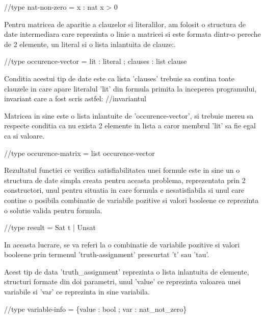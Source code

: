 //type nat-non-zero = x : nat {x > 0}


Pentru matricea de aparitie a clauzelor si literalilor, am folosit o structura de date intermediara care reprezinta o linie a matricei si este formata dintr-o pereche de 2 elemente, un literal si o lista inlantuita de clauze:.

//type occurence-vector = {lit : literal ; clauses : list clause}

Conditia acestui tip de date este ca lista 'clauses' trebuie sa contina toate clauzele in care apare literalul 'lit' din formula primita la inceperea programului, invariant care a fost scris astfel:
//invariantul

Matricea in sine este o lista inlantuite de 'occurence-vector', si trebuie mereu sa respecte conditia ca nu exista 2 elemente in lista a caror membrul 'lit' sa fie egal ca si valoare.

//type occurence-matrix = list occurence-vector


Rezultatul functiei ce verifica satisfiabilitatea unei formule este in sine un o structura de date simpla creata pentru aceasta problema, reprezentata prin 2 constructori, unul pentru situatia in care formula e nesatisfiabila si unul care contine o posibila combinatie de variabile pozitive si valori booleene ce reprezinta o solutie valida pentru formula. 

//type result = Sat t | Unsat

In aceasta lucrare, se va referi la o combinatie de variabile pozitive si valori booleene prin termenul 'truth-assignment' prescurtat 't' sau 'tau'.

Acest tip de data 'truth\_assignment' reprezinta o lista inlantuita de elemente, structuri formate din doi parametri, unul 'value' ce reprezinta valoarea unei variabile si 'var' ce reprezinta in sine variabila.

//type variable-info = \{value : bool ; var : nat\_not\_zero\}

